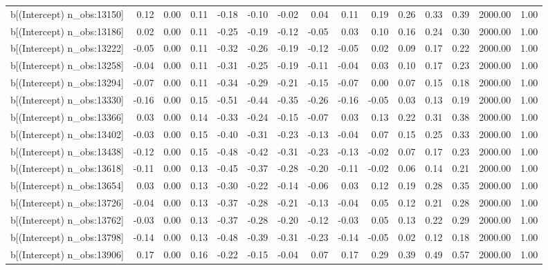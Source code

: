 \begin{table}[ht]
\begin{tabular}{rrrrrrrrrrrrrrr}
  b[(Intercept) n\_obs:13150] & 0.12 & 0.00 & 0.11 & -0.18 & -0.10 & -0.02 & 0.04 & 0.11 & 0.19 & 0.26 & 0.33 & 0.39 & 2000.00 & 1.00 \\ 
  b[(Intercept) n\_obs:13186] & 0.02 & 0.00 & 0.11 & -0.25 & -0.19 & -0.12 & -0.05 & 0.03 & 0.10 & 0.16 & 0.24 & 0.30 & 2000.00 & 1.00 \\ 
  b[(Intercept) n\_obs:13222] & -0.05 & 0.00 & 0.11 & -0.32 & -0.26 & -0.19 & -0.12 & -0.05 & 0.02 & 0.09 & 0.17 & 0.22 & 2000.00 & 1.00 \\ 
  b[(Intercept) n\_obs:13258] & -0.04 & 0.00 & 0.11 & -0.31 & -0.25 & -0.19 & -0.11 & -0.04 & 0.03 & 0.10 & 0.17 & 0.23 & 2000.00 & 1.00 \\ 
  b[(Intercept) n\_obs:13294] & -0.07 & 0.00 & 0.11 & -0.34 & -0.29 & -0.21 & -0.15 & -0.07 & 0.00 & 0.07 & 0.15 & 0.18 & 2000.00 & 1.00 \\ 
  b[(Intercept) n\_obs:13330] & -0.16 & 0.00 & 0.15 & -0.51 & -0.44 & -0.35 & -0.26 & -0.16 & -0.05 & 0.03 & 0.13 & 0.19 & 2000.00 & 1.00 \\ 
  b[(Intercept) n\_obs:13366] & 0.03 & 0.00 & 0.14 & -0.33 & -0.24 & -0.15 & -0.07 & 0.03 & 0.13 & 0.22 & 0.31 & 0.38 & 2000.00 & 1.00 \\ 
  b[(Intercept) n\_obs:13402] & -0.03 & 0.00 & 0.15 & -0.40 & -0.31 & -0.23 & -0.13 & -0.04 & 0.07 & 0.15 & 0.25 & 0.33 & 2000.00 & 1.00 \\ 
  b[(Intercept) n\_obs:13438] & -0.12 & 0.00 & 0.15 & -0.48 & -0.42 & -0.31 & -0.23 & -0.13 & -0.02 & 0.07 & 0.17 & 0.23 & 2000.00 & 1.00 \\ 
  b[(Intercept) n\_obs:13618] & -0.11 & 0.00 & 0.13 & -0.45 & -0.37 & -0.28 & -0.20 & -0.11 & -0.02 & 0.06 & 0.14 & 0.21 & 2000.00 & 1.00 \\ 
  b[(Intercept) n\_obs:13654] & 0.03 & 0.00 & 0.13 & -0.30 & -0.22 & -0.14 & -0.06 & 0.03 & 0.12 & 0.19 & 0.28 & 0.35 & 2000.00 & 1.00 \\ 
  b[(Intercept) n\_obs:13726] & -0.04 & 0.00 & 0.13 & -0.37 & -0.28 & -0.21 & -0.13 & -0.04 & 0.05 & 0.12 & 0.21 & 0.28 & 2000.00 & 1.00 \\ 
  b[(Intercept) n\_obs:13762] & -0.03 & 0.00 & 0.13 & -0.37 & -0.28 & -0.20 & -0.12 & -0.03 & 0.05 & 0.13 & 0.22 & 0.29 & 2000.00 & 1.00 \\ 
  b[(Intercept) n\_obs:13798] & -0.14 & 0.00 & 0.13 & -0.48 & -0.39 & -0.31 & -0.23 & -0.14 & -0.05 & 0.02 & 0.12 & 0.18 & 2000.00 & 1.00 \\ 
  b[(Intercept) n\_obs:13906] & 0.17 & 0.00 & 0.16 & -0.22 & -0.15 & -0.04 & 0.07 & 0.17 & 0.29 & 0.39 & 0.49 & 0.57 & 2000.00 & 1.00 \\ 

\end{tabular}
\end{table}
